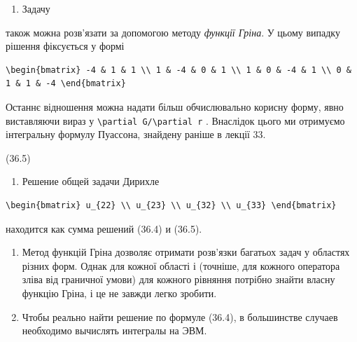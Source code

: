 \documentclass[
  ukrainian,
]{article}
\providecommand{\tightlist}{%
  \setlength{\itemsep}{0pt}\setlength{\parskip}{0pt}}
\begin{document}
\begin{enumerate}
\def\labelenumi{\arabic{enumi}.}
\tightlist
\item
  Задачу
\end{enumerate}

також можна розв'язати за допомогою методу \emph{функції Гріна}. У цьому
випадку рішення фіксується у формі

\begin{verbatim}
\begin{bmatrix} -4 & 1 & 1 \\ 1 & -4 & 0 & 1 \\ 1 & 0 & -4 & 1 \\ 0 & 1 & 1 & -4 \end{bmatrix}
\end{verbatim}

Останнє відношення можна надати більш обчислювально корисну форму, явно
виставляючи вираз у
\texttt{\textbackslash{}partial\ G/\textbackslash{}partial\ r} .
Внаслідок цього ми отримуємо інтегральну формулу Пуассона, знайдену
раніше в лекції 33.

(36.5)

\begin{enumerate}
\def\labelenumi{\arabic{enumi}.}
\setcounter{enumi}{1}
\tightlist
\item
  Решение общей задачи Дирихле
\end{enumerate}

\begin{verbatim}
\begin{bmatrix} u_{22} \\ u_{23} \\ u_{32} \\ u_{33} \end{bmatrix}
\end{verbatim}

находится как сумма решений (36.4) и (36.5).

\begin{enumerate}
\def\labelenumi{\arabic{enumi}.}
\setcounter{enumi}{2}
\item
  Метод функцій Гріна дозволяє отримати розв'язки багатьох задач у
  областях різних форм. Однак для кожної області і (точніше, для кожного
  оператора зліва від граничної умови) для кожного рівняння потрібно
  знайти власну функцію Гріна, і це не завжди легко зробити.
\item
  Чтобы реально найти решение по формуле (36.4), в большинстве случаев
  необходимо вычислять интегралы на ЭВМ.
\end{enumerate}
\end{document}
